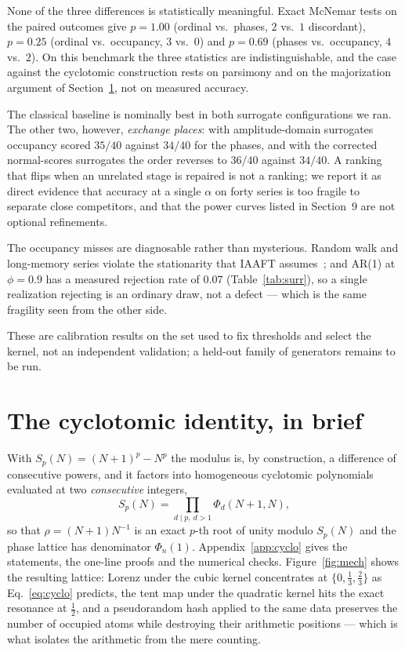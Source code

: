 \documentclass[11pt]{article}
\begin{document}
\noindent
None of the three differences is statistically meaningful. Exact McNemar tests
on the paired outcomes give $p=1.00$ (ordinal vs.\ phases, $2$ vs.\ $1$
discordant), $p=0.25$ (ordinal vs.\ occupancy, $3$ vs.\ $0$) and $p=0.69$
(phases vs.\ occupancy, $4$ vs.\ $2$). On this benchmark the three statistics
are indistinguishable, and the case against the cyclotomic construction rests on
parsimony and on the majorization argument of Section~\ref{sec:cyclo}, not on
measured accuracy.

The classical baseline is nominally best in both surrogate configurations we
ran. The other two, however, \emph{exchange places}: with amplitude-domain surrogates
occupancy scored $35/40$ against $34/40$ for the phases, and with the corrected
normal-scores surrogates the order reverses to $36/40$ against $34/40$. A
ranking that flips when an unrelated stage is repaired is not a ranking; we
report it as direct evidence that accuracy at a single $\alpha$ on forty series
is too fragile to separate close competitors, and that the power curves listed
in Section~9 are not optional refinements.

The occupancy misses are diagnosable rather than mysterious. Random walk and
long-memory series violate the stationarity that IAAFT
assumes~\cite{schreiber2000}; and AR(1) at $\phi=0.9$ has a measured rejection
rate of $0.07$ (Table~\ref{tab:surr}), so a single realization rejecting is an
ordinary draw, not a defect --- which is the same fragility seen from the other
side.

These are calibration results on the set used to fix thresholds and select the
kernel, not an independent validation; a held-out family of generators remains
to be run.

\section{The cyclotomic identity, in brief}
\label{sec:cyclo}

With $S_p(N)=(N+1)^p-N^p$ the modulus is, by construction, a difference of
consecutive powers, and it factors into homogeneous cyclotomic polynomials
evaluated at two \emph{consecutive} integers,
\begin{equation}
S_p(N)=\prod_{d\mid p,\ d>1}\Phi_d(N+1,N),
\label{eq:cyclo}
\end{equation}
so that $\rho=(N+1)N^{-1}$ is an exact $p$-th root of unity modulo $S_p(N)$ and
the phase lattice has denominator $\Phi_n(1)$. Appendix~\ref{app:cyclo} gives
the statements, the one-line proofs and the numerical checks. Figure~\ref{fig:mech}
shows the resulting lattice: Lorenz under the cubic kernel concentrates at
$\{0,\frac13,\frac23\}$ as Eq.~\eqref{eq:cyclo} predicts, the tent map under the
quadratic kernel hits the exact resonance at $\frac12$, and a pseudorandom hash
applied to the same data preserves the number of occupied atoms while destroying
their arithmetic positions --- which is what isolates the arithmetic from the
mere counting.
\end{document}
